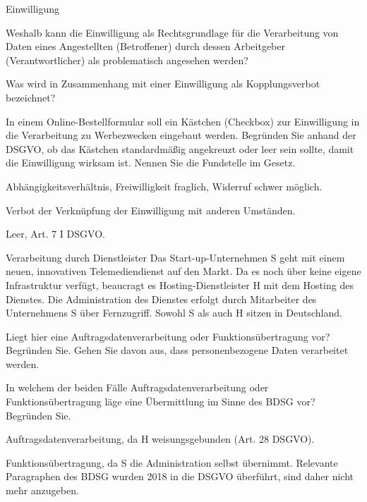 \documentclass{article}
\begin{document}
\begin{exercises}{Einwilligung}
\item Weshalb kann die Einwilligung als Rechtsgrundlage für die Verarbeitung von Daten eines Angestellten (Betroffener) durch dessen Arbeitgeber (Verantwortlicher) als problematisch angesehen werden?
\item Was wird in Zusammenhang mit einer Einwilligung als Kopplungsverbot bezeichnet?
\item In einem Online-Bestellformular soll ein Kästchen (Checkbox) zur Einwilligung in die Verarbeitung zu Werbezwecken eingebaut werden. Begründen Sie anhand der DSGVO, ob das Kästchen standardmäßig angekreuzt oder leer sein sollte, damit die Einwilligung wirksam ist. Nennen Sie die Fundstelle im Gesetz.
\end{exercises}

\begin{solutions}
  \item Abhängigkeitsverhältnis, Freiwilligkeit fraglich, Widerruf schwer möglich.
  \item Verbot der Verknüpfung der Einwilligung mit anderen Umständen.
  \item Leer, Art. 7 I DSGVO.
\end{solutions}

\begin{eexercises}{Verarbeitung durch Dienstleister}{
    Das Start-up-Unternehmen S geht mit einem neuen, innovativen Telemediendienst auf den Markt. Da es noch über keine eigene Infrastruktur verfügt, beaucragt es Hosting-Dienstleister H mit dem Hosting des Dienstes. Die Administration des Dienstes erfolgt durch Mitarbeiter des Unternehmens S über Fernzugriff. Sowohl S als auch H sitzen in Deutschland.
  }
  \item Liegt hier eine Auftragsdatenverarbeitung oder Funktionsübertragung vor? Begründen Sie. Gehen Sie davon aus, dass personenbezogene Daten verarbeitet werden.
  \item In welchem der beiden Fälle Auftragsdatenverarbeitung oder Funktionsübertragung läge eine Übermittlung im Sinne des BDSG vor? Begründen Sie.
\end{eexercises}

\begin{solutions}
  \item Auftragsdatenverarbeitung, da H weisungsgebunden (Art. 28 DSGVO).
  \item Funktionsübertragung, da S die Administration selbst übernimmt. Relevante Paragraphen des BDSG wurden 2018 in die DSGVO überführt, sind daher nicht mehr anzugeben.
\end{solutions}
\end{document}
